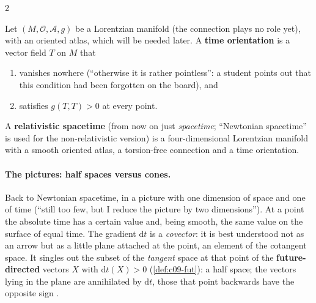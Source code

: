 \begin{paracol}{2}
\begin{definition}\label{def:c13-timeorientation}
Let $(M,\mathcal O,\mathcal A,g)$ be a Lorentzian manifold (the connection plays no role yet), with an oriented atlas, which will be needed later. A \textbf{time orientation} is a vector field $T$ on $M$ that
\begin{enumerate}
  \item vanishes nowhere (``otherwise it is rather pointless'': a student points out that this condition had been forgotten on the board), and
  \item satisfies $g(T,T)>0$ at every point.
\end{enumerate}
A \textbf{relativistic spacetime} (from now on just \emph{spacetime}; ``Newtonian spacetime'' is used for the non-relativistic version) is a four-dimensional Lorentzian manifold with a smooth oriented atlas, a torsion-free connection and a time orientation.
\end{definition}

\paragraph{The pictures: half spaces versus cones.} Back to Newtonian spacetime, in a picture with one dimension of space and one of time (``still too few, but I reduce the picture by two dimensions''). At a point the absolute time has a certain value and, being smooth, the same value on the surface of equal time. The gradient $\mathrm dt$ is a \emph{covector}: it is best understood not as an arrow but as a little plane attached at the point, an element of the cotangent space. It singles out the subset of the \emph{tangent} space at that point of the \textbf{future-directed} vectors $X$ with $\mathrm dt(X)>0$ (\cref{def:c09-fut}): a half space; the vectors lying in the plane are annihilated by $\mathrm dt$, those that point backwards have the opposite sign .


\end{paracol}

